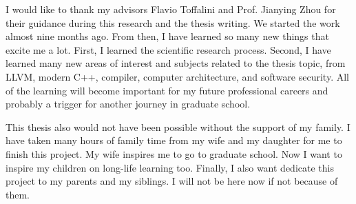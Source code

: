 \documentclass[
11pt, %
english, %
singlespacing, %
headsepline, %
]{MastersDoctoralThesis} %
\begin{document}
\begin{acknowledgements}
\addchaptertocentry{\acknowledgementname} %

I would like to thank my advisors Flavio Toffalini and Prof. Jianying Zhou for
their guidance during this research and the thesis writing. We started the work
almost nine months ago. From then, I have learned so many new things that excite
me a lot. First, I learned the scientific research process. Second, I have
learned many new areas of interest and subjects related to the thesis topic,
from LLVM, modern C++, compiler, computer architecture, and software security.
All of the learning will become important for my future professional careers and
probably a trigger for another journey in graduate school. 

This thesis also would not have been possible without the support of my family.
I have taken many hours of family time from my wife and my daughter for me to
finish this project. My wife inspires me to go to graduate school. Now I want to
inspire my children on long-life learning too. Finally, I also want dedicate
this project to my parents and my siblings. I will not be here now if not
because of them.

\end{acknowledgements}



\tableofcontents %

\listoffigures %

\listoftables %

\listoflistings %



\end{document}
